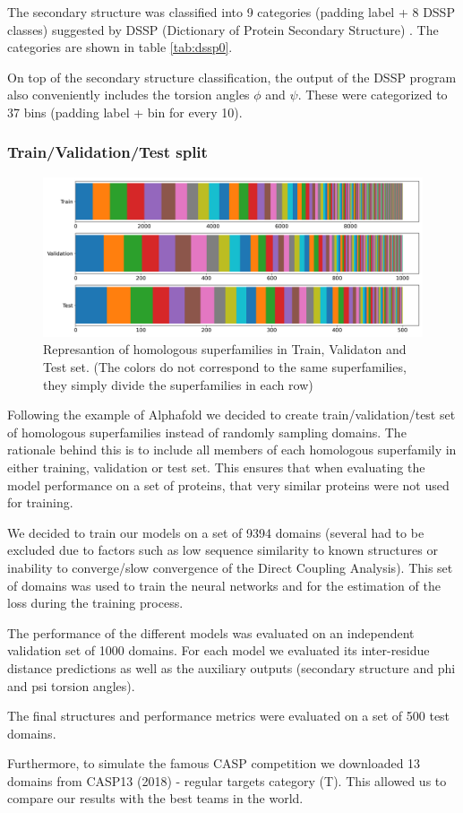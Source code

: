 The secondary structure was classified into 9 categories (padding label + 8 DSSP classes) suggested by DSSP (Dictionary of Protein Secondary Structure) \cite{dssp1, dssp2, dssp3}.
The categories are shown in table \ref{tab:dssp0}.

On top of the secondary structure classification, the output of the DSSP program also conveniently includes the torsion angles $\phi$ and $\psi$. These were categorized to 37 bins (padding label + bin for every 10\degree).

\subsubsection{Train/Validation/Test split}

\begin{figure}
    \centering
    \includegraphics[width=\linewidth]{imgs_tomas/cath_distributions_trainvaltest.png}
    \caption{Represantion of homologous superfamilies in Train, Validaton and Test set. (The colors do not correspond to the same superfamilies, they simply divide the superfamilies in each row)}
    \label{fig:cath_trainvaltest}
\end{figure}

Following the example of Alphafold \cite{alphafold} we decided to create train/validation/test set of homologous superfamilies instead of randomly sampling domains. 
The rationale behind this is to include all members of each homologous superfamily in either training, validation or test set. 
This ensures that when evaluating the model performance on a set of proteins, that very similar proteins were not used for training. 
    
We decided to train our models on a set of 9394 domains (several had to be excluded due to factors such as low sequence similarity to known structures or inability to converge/slow convergence of the Direct Coupling Analysis). This set of domains was used to train the neural networks and for the estimation of the loss during the training process.

The performance of the different models was evaluated on an independent validation set of 1000 domains. For each model we evaluated its inter-residue distance predictions as well as the auxiliary outputs (secondary structure and phi and psi torsion angles).

The final structures and performance metrics were evaluated on a set of 500 test domains.
    
Furthermore, to simulate the famous CASP competition we downloaded 13 domains from CASP13 (2018) - regular targets category (T). This allowed us to compare our results with the best teams in the world.